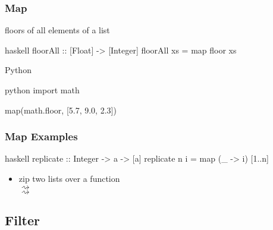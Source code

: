 \documentclass[dvipsnames]{beamer}
\theoremstyle{plain}
\begin{document}
\begin{frame}[fragile]
  \frametitle{Map}

  \begin{exampleblock}{floors of all elements of a list}
    \begin{pygments}{haskell}
floorAll :: [Float] -> [Integer]
floorAll xs = map floor xs
    \end{pygments}
  \end{exampleblock}

  \bigskip
  \begin{exampleblock}{Python}
    \begin{pygments}{python}
import math

map(math.floor, [5.7, 9.0, 2.3])
    \end{pygments}
  \end{exampleblock}
\end{frame}

\begin{frame}[fragile]
  \frametitle{Map Examples}

  \begin{exampleblock}{}
    \begin{pygments}{haskell}
replicate :: Integer -> a -> [a]
replicate n i = map (\_ -> i) [1..n]
    \end{pygments}
  \end{exampleblock}

  \pause
  \begin{itemize}
    \item zip two lists over a function\\
       $\rightsquigarrow$
      \\
       $\rightsquigarrow$
  \end{itemize}

  \begin{exampleblock}{}
  \end{exampleblock}
\end{frame}

\subsection{Filter}
\end{document}
